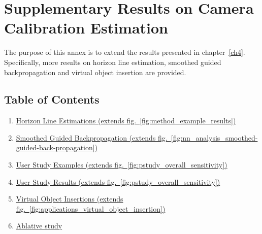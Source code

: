 \chapter{Supplementary Results on Camera Calibration Estimation}     %
\label{annex5}

\graphicspath{{annex5_figures/}}


The purpose of this annex is to extend the results presented in chapter~\ref{ch4}. Specifically, more results on horizon line estimation,
smoothed guided backpropagation and virtual object insertion are
provided.

\section*{Table of Contents}

\begin{enumerate}
\tightlist
\item
  \protect\hyperlink{he}{Horizon Line Estimations (extends fig.~\ref{fig:method_example_results})}
\item
  \protect\hyperlink{sgbp}{Smoothed Guided Backpropagation (extends fig.~\ref{fig:nn_analysis_smoothed-guided-back-propagation})}
\item
  \protect\hyperlink{study}{User Study Examples (extends fig.~\ref{fig:pstudy_overall_sensitivity})}
\item
  \protect\hyperlink{studyresults}{User Study Results (extends fig.~\ref{fig:pstudy_overall_sensitivity})}
\item
  \protect\hyperlink{voi}{Virtual Object Insertions (extends fig.~\ref{fig:applications_virtual_object_insertion})}
\item
  \protect\hyperlink{ablative}{Ablative study}
\end{enumerate}


\clearpage

\protect\hypertarget{he}{}{}

